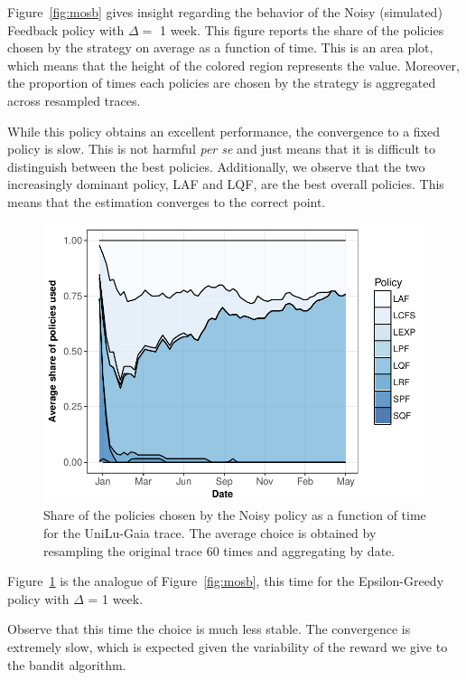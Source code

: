 \documentclass[sigconf,anonymous]{acmart}
\begin{document}
Figure~\ref{fig:mosb} gives insight regarding the behavior of the Noisy
(simulated) Feedback policy with $\Delta=$ 1 week. This figure reports the
share of the policies chosen by the strategy on average as a function of time.
This is an area plot, which means that the height of the colored region
represents the value. Moreover, the proportion of times each policies are
chosen by the strategy is aggregated across resampled traces.

While this policy obtains an excellent performance, the convergence to a fixed
policy is slow.  This is not harmful \textit{per se} and just means that it is
difficult to distinguish between the best policies. Additionally, we observe that
the two increasingly dominant policy, LAF and LQF, are the best overall policies.
This means that the estimation converges to the correct point.


\begin{figure}[]
  \centering
  \includegraphics[scale=0.6]{figures/mosaic-UniLu-Ga.pdf}

  \caption{Share of the policies chosen by the Noisy policy as a function of time
    for the UniLu-Gaia trace. The average choice
  is obtained by resampling the original trace 60 times and aggregating by
  date.}

  \label{fig:mosn}
\end{figure}

Figure~\ref{fig:mosn} is the analogue of Figure~\ref{fig:mosb}, this time for
the Epsilon-Greedy policy with $\Delta$ = 1 week.

Observe that this time the choice is much less stable. The convergence is
extremely slow, which is expected given the variability of the reward we give
to the bandit algorithm.
\end{document}
